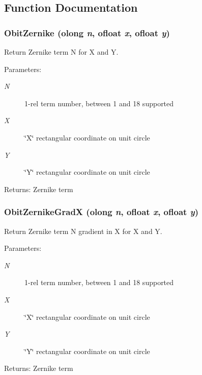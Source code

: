 \subsection{Function Documentation}
\subsubsection{ Obit\-Zernike ({\bf olong} {\em n}, {\bf ofloat} {\em x}, {\bf ofloat} {\em y})}\label{ObitZernike_8c_a0}


Return Zernike term N for X and Y. 

\begin{Desc}
\item[Parameters:]
\begin{description}
\item[{\em N}]1-rel term number, between 1 and 18 supported \item[{\em X}]\char`\"{}X\char`\"{} rectangular coordinate on unit circle \item[{\em Y}]\char`\"{}Y\char`\"{} rectangular coordinate on unit circle \end{description}
\end{Desc}
\begin{Desc}
\item[Returns:]Zernike term \end{Desc}
\subsubsection{ Obit\-Zernike\-Grad\-X ({\bf olong} {\em n}, {\bf ofloat} {\em x}, {\bf ofloat} {\em y})}\label{ObitZernike_8c_a1}


Return Zernike term N gradient in X for X and Y. 

\begin{Desc}
\item[Parameters:]
\begin{description}
\item[{\em N}]1-rel term number, between 1 and 18 supported \item[{\em X}]\char`\"{}X\char`\"{} rectangular coordinate on unit circle \item[{\em Y}]\char`\"{}Y\char`\"{} rectangular coordinate on unit circle \end{description}
\end{Desc}
\begin{Desc}
\item[Returns:]Zernike term \end{Desc}
